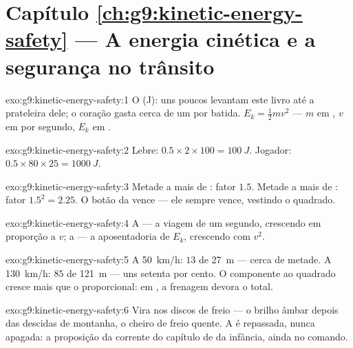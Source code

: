 \section*{Capítulo \ref{ch:g9:kinetic-energy-safety} --- A energia cinética e a segurança no trânsito}

\begin{solution}{exo:g9:kinetic-energy-safety:1}
O  (\unit{J}): uns poucos  levantam este livro até a
prateleira dele; o coração gasta cerca de um por batida.
$E_k = \frac12 m v^2$ --- $m$ em , $v$ em  por
segundo, $E_k$ em .
\end{solution}

\begin{solution}{exo:g9:kinetic-energy-safety:2}
Lebre: $0.5 \times 2 \times 100 = \qty{100}{J}$. Jogador:
$0.5 \times 80 \times 25 = \qty{1000}{J}$.
\end{solution}

\begin{solution}{exo:g9:kinetic-energy-safety:3}
Metade a mais de : fator $1.5$. Metade a mais de :
fator $1.5^2 = 2.25$. O botão da  vence --- ele sempre
vence, vestindo o quadrado.
\end{solution}

\begin{solution}{exo:g9:kinetic-energy-safety:4}
A  --- a viagem de um segundo, crescendo em
proporção a $v$; a  --- a aposentadoria de
$E_k$, crescendo com $v^2$.
\end{solution}

\begin{solution}{exo:g9:kinetic-energy-safety:5}
A \qty{50}{km/h}: $13$ de \qty{27}{m} --- cerca de metade. A
\qty{130}{km/h}: $85$ de \qty{121}{m} --- uns setenta por cento. O
componente ao quadrado cresce mais que o proporcional: em ,
a frenagem devora o total.
\end{solution}

\begin{solution}{exo:g9:kinetic-energy-safety:6}
Vira  nos discos de freio --- o brilho âmbar depois das descidas
de montanha, o cheiro de freio quente. A  é repassada, nunca
apagada: a proposição da corrente do capítulo de  da infância,
ainda no comando.
\end{solution}

